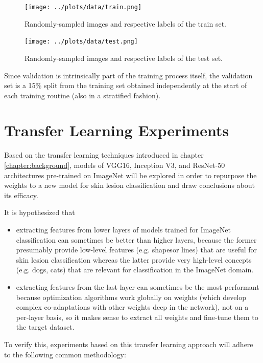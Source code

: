 \begin{figure}[ht]
    \centering
    \texttt{[image: ../plots/data/train.png]}
    \caption{Randomly-sampled images and respective labels of the train set.}
    \label{fig:data_train}
\end{figure}

\begin{figure}[ht]
    \centering
    \texttt{[image: ../plots/data/test.png]}
    \caption{Randomly-sampled images and respective labels of the test set.}
    \label{fig:data_test}
\end{figure}

Since validation is intrinsically part of the training process itself, the validation set is a 15\% split from the training set obtained independently at the start of each training routine (also in a stratified fashion).

\section{Transfer Learning Experiments}

Based on the transfer learning techniques introduced in chapter \ref{chapter:background}, models of VGG16, Inception V3, and ResNet-50 architectures pre-trained on ImageNet will be explored in order to repurpose the weights to a new model for skin lesion classification and draw conclusions about its efficacy.

It is hypothesized that

\begin{itemize}
    \item extracting features from lower layers of models trained for ImageNet classification can sometimes be better than higher layers, because the former presumably provide low-level features (e.g. shapesor lines) that are useful for skin lesion classification whereas the latter provide very high-level concepts (e.g. dogs, cats) that are relevant for classification in the ImageNet domain.
    \item extracting features from the last layer can sometimes be the most performant because optimization algorithms work globally on weights (which develop complex co-adaptations with other weights deep in the network), not on a per-layer basis, so it makes sense to extract all weights and fine-tune them to the target dataset.
\end{itemize}

To verify this, experiments based on this transfer learning approach will adhere to the following common methodology:


